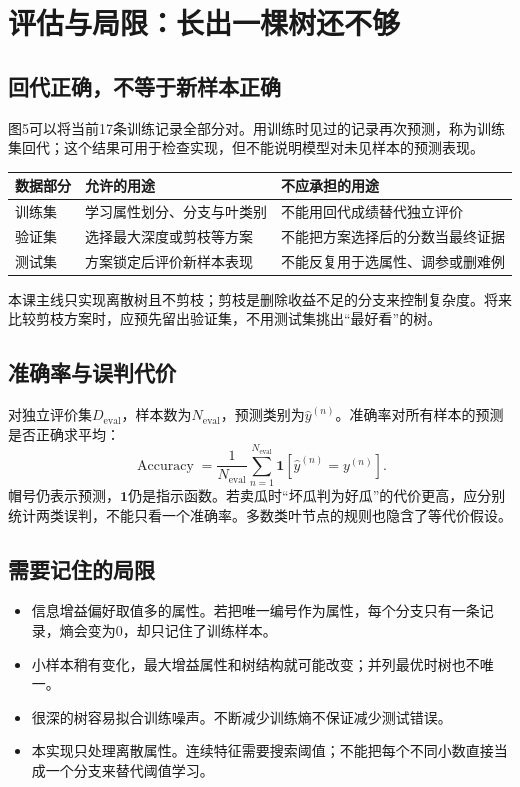 \documentclass[UTF8,a4paper,11pt,fontset=fandol]{ctexart}
\numberwithin{equation}{subsection}
\begin{document}
\clearpage
\section{评估与局限：长出一棵树还不够}
\subsection{回代正确，不等于新样本正确}
图5可以将当前17条训练记录全部分对。用训练时见过的记录再次预测，称为训练集回代；这个结果可用于检查实现，但不能说明模型对未见样本的预测表现。

\par\noindent\begin{tabularx}{\textwidth}{L{2.4cm}Y Y}
\toprule
数据部分 & 允许的用途 & 不应承担的用途\\
\midrule
训练集 & 学习属性划分、分支与叶类别 & 不能用回代成绩替代独立评价\\
验证集 & 选择最大深度或剪枝等方案 & 不能把方案选择后的分数当最终证据\\
测试集 & 方案锁定后评价新样本表现 & 不能反复用于选属性、调参或删难例\\
\bottomrule
\end{tabularx}\par
本课主线只实现离散树且不剪枝；剪枝是删除收益不足的分支来控制复杂度。将来比较剪枝方案时，应预先留出验证集，不用测试集挑出“最好看”的树。

\subsection{准确率与误判代价}
对独立评价集$D_{\mathrm{eval}}$，样本数为$N_{\mathrm{eval}}$，预测类别为$\hat y^{(n)}$。准确率对所有样本的预测是否正确求平均：
\begin{equation}
\operatorname{Accuracy}
=\frac1{N_{\mathrm{eval}}}\sum_{n=1}^{N_{\mathrm{eval}}}
\mathbf1[\hat y^{(n)}=y^{(n)}].
\end{equation}
帽号仍表示预测，$\mathbf1$仍是指示函数。若卖瓜时“坏瓜判为好瓜”的代价更高，应分别统计两类误判，不能只看一个准确率。多数类叶节点的规则也隐含了等代价假设。

\subsection{需要记住的局限}
\begin{itemize}
\item 信息增益偏好取值多的属性。若把唯一编号作为属性，每个分支只有一条记录，熵会变为0，却只记住了训练样本。
\item 小样本稍有变化，最大增益属性和树结构就可能改变；并列最优时树也不唯一。
\item 很深的树容易拟合训练噪声。不断减少训练熵不保证减少测试错误。
\item 本实现只处理离散属性。连续特征需要搜索阈值；不能把每个不同小数直接当成一个分支来替代阈值学习。
\end{itemize}
\end{document}
